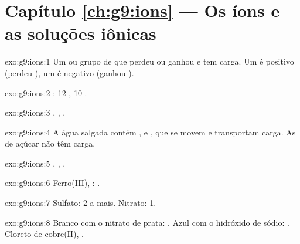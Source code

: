 \section*{Capítulo \ref{ch:g9:ions} --- Os íons e as soluções iônicas}

\begin{solution}{exo:g9:ions:1}
Um  ou grupo de  que perdeu ou ganhou  e tem carga.
Um  é positivo (perdeu ), um  é negativo (ganhou
).
\end{solution}

\begin{solution}{exo:g9:ions:2}
: 12 , 10 .
\end{solution}

\begin{solution}{exo:g9:ions:3}
, , .
\end{solution}

\begin{solution}{exo:g9:ions:4}
A água salgada contém ,  e , que se movem e
transportam carga. As  de açúcar não têm carga.
\end{solution}

\begin{solution}{exo:g9:ions:5}
, , .
\end{solution}

\begin{solution}{exo:g9:ions:6}
Ferro(III), : .
\end{solution}

\begin{solution}{exo:g9:ions:7}
Sulfato: 2  a mais. Nitrato: 1.
\end{solution}

\begin{solution}{exo:g9:ions:8}
Branco com o nitrato de prata: . Azul com o hidróxido de sódio:
. Cloreto de cobre(II), .
\end{solution}

